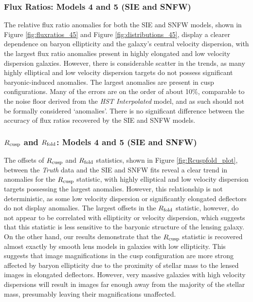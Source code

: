 \subsubsection{Flux Ratios: Models 4 and 5 (SIE and SNFW)}The relative flux ratio anomalies for both the SIE and SNFW models, shown in Figure \ref{fig:fluxratios_45} and Figure \ref{fig:distributions_45}, display a clearer dependence on baryon ellipticity and the galaxy’s central velocity dispersion, with the largest flux ratio anomalies present in highly elongated and low velocity dispersion galaxies. However, there is considerable scatter in the trends, as many highly elliptical and low velocity dispersion targets do not possess significant baryonic-induced anomalies. The largest anomalies are present in cusp configurations. Many of the errors are on the order of about 10\%, comparable to the noise floor derived from the \textit{HST Interpolated} model, and as such should not be formally considered `anomalies'. There is no significant difference between the accuracy of flux ratios recovered by the SIE and SNFW models. 
\subsubsection{$R_{\rm{cusp}}$ and $R_{\rm{fold}}$: Models 4 and 5 (SIE and SNFW)}
The offsets of $R_{\rm{cusp}}$ and $R_{\rm{fold}}$ statistics, shown in Figure \ref{fig:Rcuspfold_plot}, between the \textit{Truth} data and the SIE and SNFW fits reveal a clear trend in anomalies for the $R_{\rm{cusp}}$ statistic, with highly elliptical and low velocity dispersion targets possessing the largest anomalies. However, this relationship is not deterministic, as some low velocity dispersion or significantly elongated deflectors do not display anomalies. The largest offsets in the $R_{\rm{fold}}$ statistic, however, do not appear to be correlated with ellipticity or velocity dispersion, which suggests that this statistic is less sensitive to the baryonic structure of the lensing galaxy. On the other hand, our results demonstrate that the $R_{\rm{cusp}}$ statistic is recovered almost exactly by smooth lens models in galaxies with low ellipticity. This suggests that image magnifications in the cusp configuration are more strong affected by baryon ellipticity due to the proximity of stellar mass to the lensed images in elongated deflectors. However, very massive galaxies with high velocity dispersions will result in images far enough away from the majority of the stellar mass, presumably leaving their magnifications unaffected.
